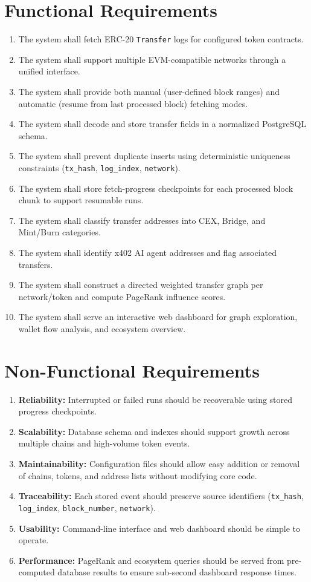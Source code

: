 \documentclass[a4paper,12pt]{report}
\begin{document}
\section*{Functional Requirements}
\begin{enumerate}
    \item The system shall fetch ERC-20 \texttt{Transfer} logs for configured token contracts.
    \item The system shall support multiple EVM-compatible networks through a unified interface.
    \item The system shall provide both manual (user-defined block ranges) and automatic
    (resume from last processed block) fetching modes.
    \item The system shall decode and store transfer fields in a normalized PostgreSQL schema.
    \item The system shall prevent duplicate inserts using deterministic uniqueness constraints
    (\texttt{tx\_hash}, \texttt{log\_index}, \texttt{network}).
    \item The system shall store fetch-progress checkpoints for each processed block chunk to
    support resumable runs.
    \item The system shall classify transfer addresses into CEX, Bridge, and Mint/Burn categories.
    \item The system shall identify x402 AI agent addresses and flag associated transfers.
    \item The system shall construct a directed weighted transfer graph per network/token and
    compute PageRank influence scores.
    \item The system shall serve an interactive web dashboard for graph exploration, wallet
    flow analysis, and ecosystem overview.
\end{enumerate}

\section*{Non-Functional Requirements}
\begin{enumerate}
    \item \textbf{Reliability:} Interrupted or failed runs should be recoverable using stored
    progress checkpoints.
    \item \textbf{Scalability:} Database schema and indexes should support growth across multiple
    chains and high-volume token events.
    \item \textbf{Maintainability:} Configuration files should allow easy addition or removal of
    chains, tokens, and address lists without modifying core code.
    \item \textbf{Traceability:} Each stored event should preserve source identifiers
    (\texttt{tx\_hash}, \texttt{log\_index}, \texttt{block\_number}, \texttt{network}).
    \item \textbf{Usability:} Command-line interface and web dashboard should be simple to operate.
    \item \textbf{Performance:} PageRank and ecosystem queries should be served from
    pre-computed database results to ensure sub-second dashboard response times.
\end{enumerate}
\end{document}
